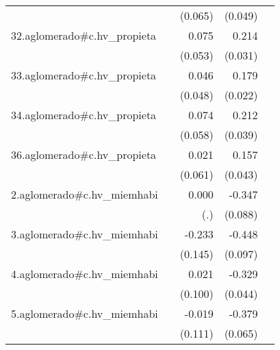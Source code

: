 {\begin{longtable}{l*{4}{D{.}{.}{-1}}}
            &                     &     (0.065)         &     (0.049)         &                     \\
\addlinespace
32.aglomerado#c.hv\_propieta&                     &       0.075         &       0.214\sym{***}&                     \\
            &                     &     (0.053)         &     (0.031)         &                     \\
\addlinespace
33.aglomerado#c.hv\_propieta&                     &       0.046         &       0.179\sym{***}&                     \\
            &                     &     (0.048)         &     (0.022)         &                     \\
\addlinespace
34.aglomerado#c.hv\_propieta&                     &       0.074         &       0.212\sym{***}&                     \\
            &                     &     (0.058)         &     (0.039)         &                     \\
\addlinespace
36.aglomerado#c.hv\_propieta&                     &       0.021         &       0.157\sym{***}&                     \\
            &                     &     (0.061)         &     (0.043)         &                     \\
\addlinespace
2.aglomerado#c.hv\_miemhabi&                     &       0.000         &      -0.347\sym{***}&                     \\
            &                     &         (.)         &     (0.088)         &                     \\
\addlinespace
3.aglomerado#c.hv\_miemhabi&                     &      -0.233         &      -0.448\sym{***}&                     \\
            &                     &     (0.145)         &     (0.097)         &                     \\
\addlinespace
4.aglomerado#c.hv\_miemhabi&                     &       0.021         &      -0.329\sym{***}&                     \\
            &                     &     (0.100)         &     (0.044)         &                     \\
\addlinespace
5.aglomerado#c.hv\_miemhabi&                     &      -0.019         &      -0.379\sym{***}&                     \\
            &                     &     (0.111)         &     (0.065)         &                     \\

\end{longtable}}
